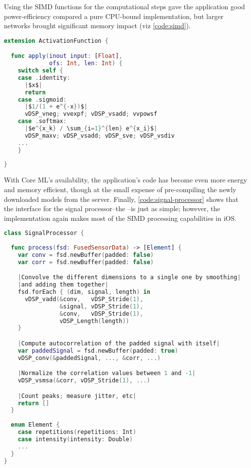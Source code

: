 Using the SIMD functions for the computational steps gave the application good power-efficiency compared a pure CPU-bound implementation, but larger networks brought significant memory impact (viz \autoref{code:simd}).

\begin{lstlisting}[caption={SIMD}, label={code:simd}, language=swift, escapechar=|]
extension ActivationFunction {

  func apply(inout input: [Float], 
             ofs: Int, len: Int) {
    switch self {
    case .identity: 
      |$x$|
      return
    case .sigmoid:
      |$1/(1 + e^{-x})$|
      vDSP_vneg; vvexpf; vDSP_vsadd; vvpowsf
    case .softmax:
      |$e^{x_k} / \sum_{i=1}^{len} e^{x_i}$|
      vDSP_maxv; vDSP_vsadd; vDSP_sve; vDSP_vsdiv
    ...
    }
    
}
\end{lstlisting}

With Core ML's availability, the application's code has become even more energy and memory efficient, though at the small expense of pre-compiling the newly downloaded models from the server. Finally, \autoref{code:signal-processor} shows that the interface for the signal processor--the --is just as simple; however, the implementation again makes most of the SIMD processing capabilities in iOS.

\begin{lstlisting}[caption={Signal processor}, label={code:signal-processor}, language=swift, escapechar=|]
class SignalProcessor {
  
  func process(fsd: FusedSensorData) -> [Element] { 
    var conv = fsd.newBuffer(padded: false)
    var corr = fsd.newBuffer(padded: false)

    |Convolve the different dimensions to a single one by smoothing|
    |and adding them together|
    fsd.forEach { (dim, signal, length) in
      vDSP_vadd(&conv,   vDSP_Stride(1),
                &signal, vDSP_Stride(1),
                &conv,   vDSP_Stride(1),
                vDSP_Length(length))
    }

    |Compute autocorrelation of the padded signal with itself|
    var paddedSignal = fsd.newBuffer(padded: true)
    vDSP_conv(&paddedSignal, ..., &corr, ...)

    |Normalize the correlation values between 1 and -1|
    vDSP_vsmsa(&corr, vDSP_Stride(1), ...)

    |Count peaks; measure jitter, etc|
    return []
  }
    
  enum Element {
    case repetitions(repetitions: Int)
    case intensity(intensity: Double)
    ...
  }
}
\end{lstlisting}

